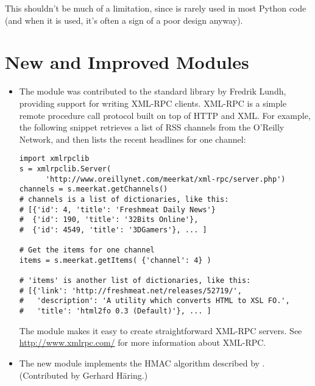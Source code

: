 \documentclass{howto}
\begin{document}
This shouldn't be much of a limitation, since  is rarely
used in most Python code (and when it is used, it's often a sign of a
poor design anyway).

\begin{seealso}


\end{seealso}


\section{New and Improved Modules}

\begin{itemize}

  \item The  module was contributed to the standard
  library by Fredrik Lundh, providing support for writing XML-RPC
  clients.  XML-RPC is a simple remote procedure call protocol built on
  top of HTTP and XML. For example, the following snippet retrieves a
  list of RSS channels from the O'Reilly Network, and then 
  lists the recent headlines for one channel:

\begin{verbatim}
import xmlrpclib
s = xmlrpclib.Server(
      'http://www.oreillynet.com/meerkat/xml-rpc/server.php')
channels = s.meerkat.getChannels()
# channels is a list of dictionaries, like this:
# [{'id': 4, 'title': 'Freshmeat Daily News'}
#  {'id': 190, 'title': '32Bits Online'},
#  {'id': 4549, 'title': '3DGamers'}, ... ]

# Get the items for one channel
items = s.meerkat.getItems( {'channel': 4} )

# 'items' is another list of dictionaries, like this:
# [{'link': 'http://freshmeat.net/releases/52719/', 
#   'description': 'A utility which converts HTML to XSL FO.', 
#   'title': 'html2fo 0.3 (Default)'}, ... ]
\end{verbatim}

The  module makes it easy to create
straightforward XML-RPC servers.  See \url{http://www.xmlrpc.com/} for
more information about XML-RPC.

  \item The new  module implements the HMAC
  algorithm described by .
  (Contributed by Gerhard H\"aring.)


\end{itemize}
\end{document}
